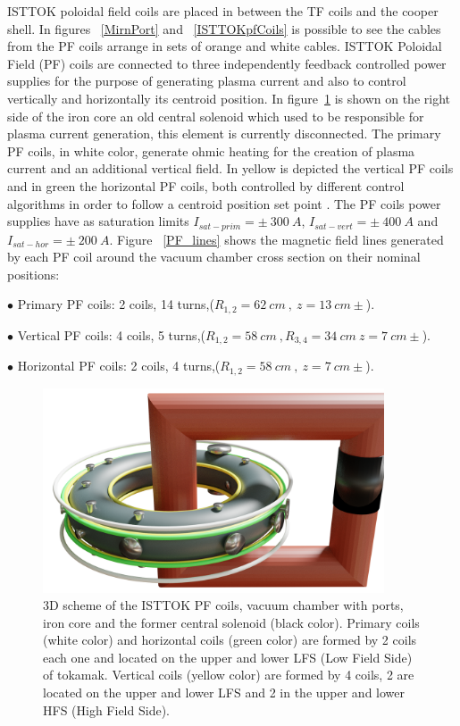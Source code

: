 ISTTOK poloidal field coils are placed in between the TF coils and the cooper shell. In figures ~\ref{MirnPort} and ~\ref{ISTTOKpfCoils} is possible to see the cables from the PF coils arrange in sets of orange and white cables. ISTTOK Poloidal Field (PF) coils are connected to three independently feedback controlled power supplies for the purpose of generating plasma current and also to control vertically and horizontally its centroid position. In figure~\ref{PF_coils} is shown on the right side of the iron core an  old central solenoid which used to be responsible for plasma current generation, this element is currently disconnected.  The primary PF coils, in white color, generate ohmic heating for the creation of plasma current and an additional vertical field. In yellow is depicted the vertical PF coils and in green the horizontal PF coils, both controlled by different control algorithms in order to follow a centroid position set point \cite{IvoPID}. The PF coils power supplies have as saturation limits $I_{sat-prim}=\pm~ 300~A$, $I_{sat-vert}=\pm~ 400~A$ and $I_{sat-hor}=\pm~ 200~A$. Figure ~\ref{PF_lines} shows the magnetic field lines generated by each PF coil around the vacuum chamber cross section on their nominal positions:\smallskip

$\bullet$ Primary PF coils: 2 coils, 14 turns,($R_{1,2}=62 ~cm~,~z=13 ~cm\pm$).
\smallskip

$\bullet$ Vertical PF coils: 4 coils, 5 turns,($R_{1,2}=58 ~cm~, R_{3,4}=34 ~cm ~z=7 ~cm\pm$).
\smallskip

$\bullet$ Horizontal PF coils: 2 coils, 4 turns,($R_{1,2}=58 ~cm~, ~z=7 ~cm\pm$).
\smallskip

\begin{figure}[htbp]
	\centering
	\includegraphics[width=0.9\textwidth]{Chp4/ist_coils.png}
	\caption{ 3D scheme of the ISTTOK PF coils, vacuum chamber with ports, iron core and the former central solenoid (black color). Primary coils (white color) and horizontal coils (green color) are formed by 2 coils each one and located on the  upper and lower LFS (Low Field Side) of tokamak. Vertical coils (yellow color) are formed by 4 coils, 2 are located on the upper and lower LFS and 2 in the upper and lower HFS (High Field Side). \label{PF_coils}  }
\end{figure}

